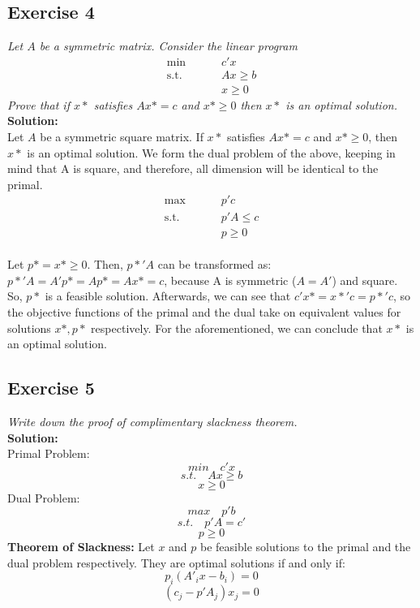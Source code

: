 \documentclass[12pt]{article}
\begin{document}
\subsection*{Exercise 4}
\textit{Let $A$ be a symmetric matrix. Consider the linear program}
\\
\begin{align*}
\text{min } \qquad & c'x \\
\text{s.t. } \qquad  & Ax \geqslant b \\
							& x \geqslant 0
\end{align*}
\textit{Prove that if $x*$ satisfies $A x* = c$ and $x* \geqslant 0$ then $x*$ is an optimal solution.}
\textbf{Solution:} \\  
Let $A$ be a symmetric square matrix. If $x*$ satisfies $Ax* = c$ and $x* \geqslant 0$, then $x*$ is an optimal solution. We form the dual problem of the above, keeping in mind that A is square, and therefore, all dimension will be identical to the primal.
\begin{align*}
\text{max } \qquad & p' c \\
\text{s.t. } \qquad  & p'A \leqslant c \\
							& p \geqslant 0
\end{align*} \\
Let $p* = x* \geqslant 0$. Then, $p *' A$ can be transformed as: $p *' A = A'p* = Ap* = Ax* = c$, because A is symmetric ($A = A'$) and square. So, $p*$ is a feasible solution. Afterwards, we can see that $c'x* = x*'c = p*'c$, so the objective functions of the primal and the dual take on equivalent values for solutions $x*, p*$ respectively. For the aforementioned, we can conclude that $x*$ is an optimal solution.
\newpage

\subsection*{Exercise 5}
\textit{Write down the proof of complimentary slackness theorem. }
\\ 
\textbf{Solution:} \\  
Primal Problem: \newline
$$min\quad c'x$$ $$s.t. \quad Ax \geq b$$ $$x \geq 0$$
Dual Problem: \newline
$$max \quad p'b$$ $$s.t. \quad p'A = c'$$ $$p \geq 0$$
\textbf{Theorem of Slackness:} \newline
Let $x$ and $p$ be feasible solutions to the primal and the dual problem respectively. They are optimal solutions if and only if:
$$p_i(A'_ix - b_i) = 0$$
$$(c_j - p'A_j)x_j = 0$$
\end{document}
